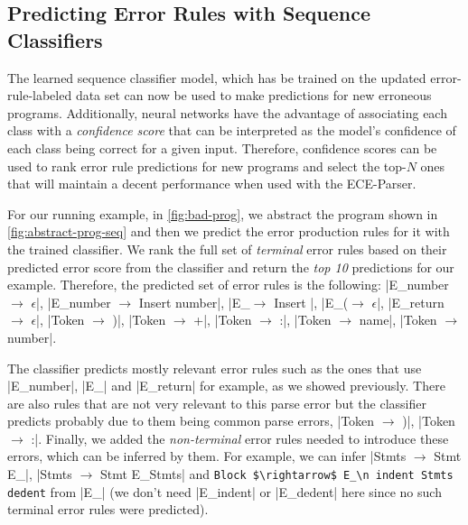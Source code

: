 \subsection{Predicting Error Rules with Sequence Classifiers}
\label{sec:overview:seq-classifiers}
The learned sequence classifier model, which has be trained on the updated
error-rule-labeled data set can now be used to make predictions for new
erroneous programs. Additionally, neural networks have the advantage of
associating each class with a \emph{confidence score} that can be interpreted as
the model's confidence of each class being correct for a given input. Therefore,
confidence scores can be used to rank error rule predictions for new programs
and select the top-$N$ ones that will maintain a decent performance when used
with the ECE-Parser.

For our running example, in \autoref{fig:bad-prog}, we abstract the program
shown in \autoref{fig:abstract-prog-seq} and then we predict the error
production rules for it with the trained classifier. We rank the full set of
\emph{terminal} error rules based on their predicted error score from the
classifier and return the \emph{top 10} predictions for our example. Therefore,
the predicted set of error rules is the following:
%
|E_number $\rightarrow$ $\epsilon$|, \linebreak
%
|E_number $\rightarrow$ Insert number|, |E_\n $\rightarrow$ Insert \n|,
%
|E_($\rightarrow$ $\epsilon$|,
%
|E_return $\rightarrow$ $\epsilon$|, |Token $\rightarrow$ )|,
%
|Token $\rightarrow$ +|, |Token $\rightarrow$ :|, |Token $\rightarrow$ name|,
%
|Token $\rightarrow$ number|.

The classifier predicts mostly relevant error rules such as the ones that use
|E_number|, \linebreak
%
|E_\n| and |E_return| for example, as we showed previously. There are also rules
that are not very relevant to this parse error but the classifier predicts
probably due to them being common parse errors, \eg
%
|Token $\rightarrow$ )|, |Token $\rightarrow$ :|. Finally, we added the
\emph{non-terminal} error rules needed to introduce these errors, which can be
inferred by them. For example, we can infer
%
|Stmts $\rightarrow$ Stmt E_\n|, |Stmts $\rightarrow$ Stmt E_\n Stmts| and
%
\lstinline{Block $\rightarrow$ E_\n indent Stmts dedent} from |E_\n| (we don't
need \linebreak |E_indent| or |E_dedent| here since no such terminal error rules were
predicted).

